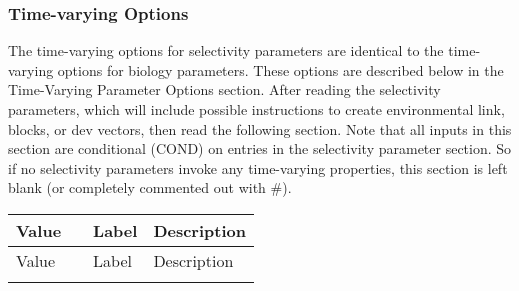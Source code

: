 \subsubsection{Time-varying Options}
The time-varying options for selectivity parameters are identical to the time-varying options for biology parameters.  These options are described below in the Time-Varying Parameter Options section.  After reading the selectivity parameters, which will include possible instructions to create environmental link, blocks, or dev vectors, then read the following section.  Note that all inputs in this section are conditional (COND) on entries in the selectivity parameter section.  So if no selectivity parameters invoke any time-varying properties, this section is left blank (or completely commented out with \#).

\begin{center}
	\begin{longtable}{p{2cm} p{1cm} p{4cm} p{8cm}}
		Value & & Label & Description\\
		\hline
		\endfirsthead

		Value & & Label & Description\\
		\hline
		\endhead

		\endfoot

		\endlastfoot


\end{longtable}
\end{center}
